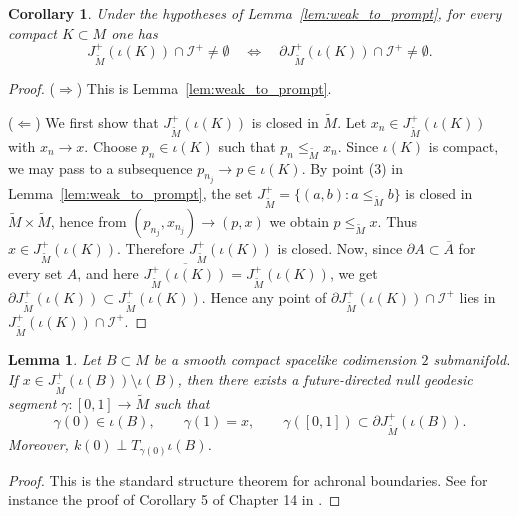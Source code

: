 \documentclass[a4paper, reqno]{amsart}
\numberwithin{equation}{section}
\theoremstyle{plain}
\newtheorem{lemma}[theorem]{Lemma}
\newtheorem{corollary}[theorem]{Corollary}
\theoremstyle{definition}
\theoremstyle{remark}
\begin{document}
\begin{corollary}\label{rem:weak_strong_equiv}
Under the hypotheses of Lemma~\ref{lem:weak_to_prompt}, for every compact $K\subset M$ one has
$$
J^+_{\tilde M}(\iota(K))\cap\mathscr I^+\neq\emptyset
\quad\Longleftrightarrow\quad
\partial J^+_{\tilde M}(\iota(K))\cap\mathscr I^+\neq\emptyset.
$$
\end{corollary}
\begin{proof}
($\Rightarrow$) This is Lemma~\ref{lem:weak_to_prompt}.

($\Leftarrow$) We first show that $J^+_{\tilde M}(\iota(K))$ is closed in $\tilde M$. Let $x_n\in J^+_{\tilde M}(\iota(K))$ with $x_n\to x$. Choose $p_n\in \iota(K)$ such that $p_n\le_{\tilde M} x_n$. Since $\iota(K)$ is compact, we may pass to a subsequence $p_{n_j}\to p\in \iota(K)$. By point (3) in Lemma~\ref{lem:weak_to_prompt}, the set $J^+_{\tilde M}=\{(a,b): a\le_{\tilde M} b\}$ is closed in $\tilde M\times\tilde M$, hence from $(p_{n_j},x_{n_j})\to(p,x)$ we obtain $p\le_{\tilde M} x$. Thus $x\in J^+_{\tilde M}(\iota(K))$. Therefore $J^+_{\tilde M}(\iota(K))$ is closed. Now, since $\partial A\subset \overline{A}$ for every set $A$, and here $\overline{J^+_{\tilde M}(\iota(K))}=J^+_{\tilde M}(\iota(K))$,
we get $\partial J^+_{\tilde M}(\iota(K))\subset J^+_{\tilde M}(\iota(K)).$ Hence any point of $\partial J^+_{\tilde M}(\iota(K))\cap\mathscr I^+$ lies in $J^+_{\tilde M}(\iota(K))\cap\mathscr I^+$.

\end{proof}

\begin{lemma}\label{lem:generators}
Let $B\subset M$ be a smooth compact spacelike codimension $2$ submanifold. If
$x\in J^+_{\tilde M}(\iota(B))\setminus\iota(B)$, then there exists a future-directed null geodesic segment
$\gamma:[0,1]\to\tilde M$ such that
$$
\gamma(0)\in\iota(B),\qquad \gamma(1)=x,\qquad \gamma([0,1])\subset \partial J^+_{\tilde M}(\iota(B)).
$$
Moreover, $k(0)\perp T_{\gamma(0)}\iota(B)$.
\end{lemma}
\begin{proof}
This is the standard structure theorem for achronal boundaries. See for instance the proof of Corollary 5 of Chapter 14 in \cite{oneill1983semiriemannian}.

\end{proof}
\end{document}
